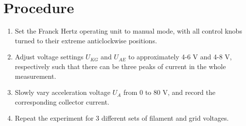 \section{Procedure}

\begin{enumerate}
    \item Set the Franck Hertz operating unit to manual mode, with all control knobs turned to their extreme anticlockwise positions.
    \item Adjust voltage settings $U_{KG}$ and $U_{AE}$ to approximately 4-6 V and 4-8 V, respectively such that there can be three peaks of current in the whole measurement.
    \item Slowly vary acceleration voltage $U_A$ from 0 to 80 V, and record the corresponding collector current.
    \item Repeat the experiment for 3 different sets of filament and grid voltages.
\end{enumerate}